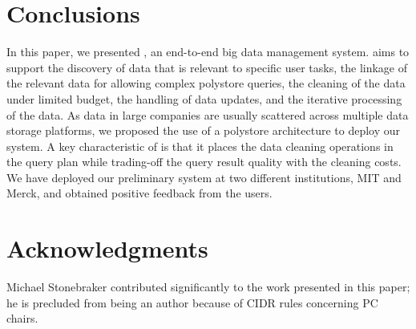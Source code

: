 \section{Conclusions}
\label{sec:conclusion}

In this paper, we presented \dcv,  an end-to-end big data management system. 
\dcv aims to support  the discovery of data that is relevant to specific user tasks, 
the linkage of the relevant data for allowing complex polystore queries, 
the cleaning of the data under limited budget, 
the handling of  data updates, 
and the iterative processing of the data. 
As data in large companies are usually scattered across multiple
data storage platforms, we proposed the use of a polystore architecture to deploy our system.
A key characteristic of \dcv is that it places the data cleaning operations in the query plan
while  trading-off the query result quality with the cleaning costs. 
We have deployed our preliminary system at two different institutions, MIT and Merck, and obtained positive
feedback from the users.

\section{Acknowledgments}

 Michael Stonebraker contributed significantly to the work presented in this paper;
 he is precluded from being an author because of CIDR rules concerning PC chairs.


